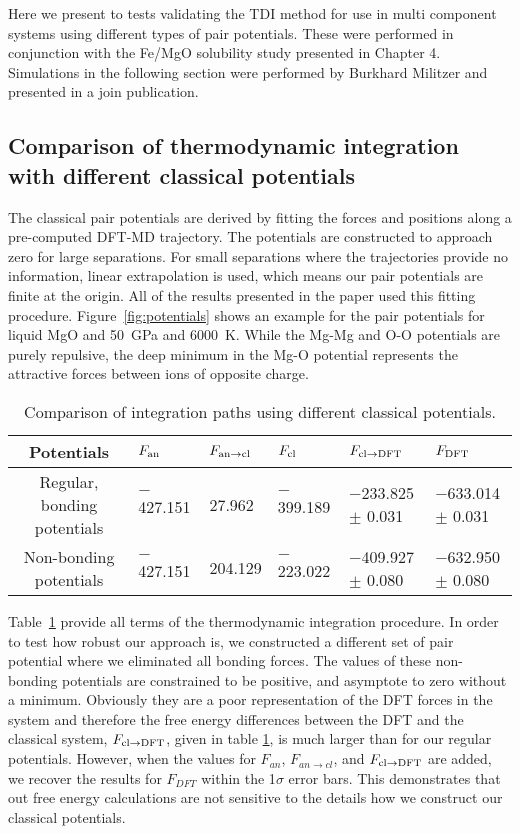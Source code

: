 Here we present to tests validating the TDI method for use in multi component systems
using different types of pair potentials. These were performed in conjunction with
the Fe/MgO solubility study presented in Chapter 4. Simulations in the following section were
performed by Burkhard Militzer and presented in a join publication.

\subsection{Comparison of thermodynamic integration with different classical potentials}

The classical pair potentials are derived by fitting the forces and
positions along a pre-computed DFT-MD trajectory. The potentials are
constructed to approach zero for large separations. For small separations
where the trajectories provide no information, linear extrapolation is
used, which means our pair potentials are finite at the origin. All of the
results presented in the paper used this fitting procedure.
Figure~\ref{fig:potentials} shows an example for the pair potentials for
liquid MgO and 50~GPa and 6000~K.  While the Mg-Mg and O-O potentials are
purely repulsive, the deep minimum in the Mg-O potential represents the
attractive forces between ions of opposite charge.

\begin{table}[!h]
    \centering
\caption{Comparison of integration paths using different classical potentials.\label{tab:compare_pots}}
\begin{adjustbox}{max width=\textwidth}
\begin{tabular}{clllll}
\hline
Potentials & $F_{\rm an}$ & $F_{\rm an \to cl}$ & $F_{\rm cl}$ & $F_{\rm cl \to DFT}$ & $F_{\rm DFT}$ \\
\hline
Regular, bonding potentials & $-$427.151 & 27.962 & $-$399.189 & $-$233.825 $\pm$ 0.031 & $-$633.014  $\pm$ 0.031 \\
Non-bonding potentials & $-$427.151 & 204.129 & $-$223.022 & $-$409.927 $\pm$ 0.080 & $-$632.950 $\pm$ 0.080 \\
\hline
\end{tabular}
\end{adjustbox}
\end{table}

Table~\ref{tab:compare_pots} provide all terms of the thermodynamic integration
procedure. In order to test how robust our approach is, we constructed a different
set of pair potential where we eliminated all bonding forces. The values of these
non-bonding potentials are constrained to be positive, and asymptote to zero without
a minimum. Obviously they are a poor representation of the DFT forces in the system
and therefore the free energy differences between the DFT and the classical system,
$F_{\rm cl \to DFT}$, given in table \ref{tab:compare_pots}, is much larger than for
our regular potentials.  However, when the values for $F_{an}$, $F_{an \to cl}$, and
$F_{\rm cl \to DFT}$ are added, we recover the results for $F_{DFT}$ within the
1$\sigma$ error bars. This demonstrates that out free energy calculations are not
sensitive to the details how we construct our classical potentials.


